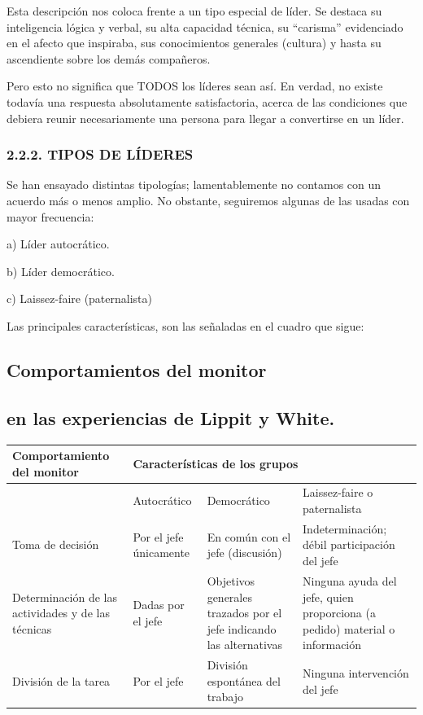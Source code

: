Esta descripción nos coloca frente a un tipo especial de líder. Se destaca su inteligencia lógica y verbal, su alta capacidad técnica, su “carisma” evidenciado en el afecto que inspiraba, sus conocimientos generales (cultura) y hasta su ascendiente sobre los demás compañeros.



Pero esto no significa que TODOS los líderes sean así. En verdad, no existe todavía una respuesta absolutamente satisfactoria, acerca de las condiciones que debiera reunir necesariamente una persona para llegar a convertirse en un líder.

\subsubsection*{2.2.2. TIPOS DE LÍDERES}
Se han ensayado distintas tipologías; lamentablemente no contamos con un acuerdo más o menos amplio. No obstante, seguiremos algunas de las usadas con mayor frecuencia:

a) Líder autocrático.

b) Líder democrático.

c) Laissez-faire (paternalista)

Las principales características, son las señaladas en el cuadro que sigue:

\subsection*{Comportamientos del monitor}
\subsection*{en las experiencias de Lippit y White.}

\begin{center}
\small
\begin{tabular}{|p{}|p{}|p{}|p{}|}
\hline
Comportamiento del monitor & \multicolumn{3}{|p{\dimexpr0.735\linewidth-2\tabcolsep\relax}|}{Características de los grupos} \\ \hline
 & Autocrático & Democrático & Laissez-faire o paternalista \\ \hline
Toma de decisión & Por el jefe únicamente & En común con el jefe (discusión) & Indeterminación; débil participación del jefe \\ \hline
Determinación de las actividades y de las técnicas & Dadas por el jefe & Objetivos generales trazados por el jefe indicando las alternativas & Ninguna ayuda del jefe, quien proporciona (a pedido) material o información \\ \hline
División de la tarea & Por el jefe & División espontánea del trabajo & Ninguna intervención del jefe \\ \hline
\end{tabular}
\end{center}

